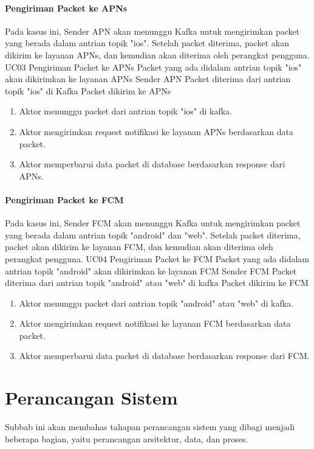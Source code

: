 \paragraph{Pengiriman Packet ke APNs}
\par Pada kasus ini, Sender APN akan menunggu Kafka untuk mengirimkan packet yang berada dalam antrian topik "ios".
Setelah packet diterima, packet akan dikirim ke layanan APNs, dan kemudian akan diterima oleh perangkat pengguna.
\tableUcDesc
{UC03}
{Pengiriman Packet ke APNs}
{Packet yang ada didalam antrian topik "ios" akan dikirimkan ke layanan APNs}
{Sender APN}
{Packet diterima dari antrian topik "ios" di Kafka}
{Packet dikirim ke APNs}
{
\begin{enumerate}
    \item Aktor menunggu packet dari antrian topik "ios" di kafka.
    \item Aktor mengirimkan request notifikasi ke layanan APNs berdasarkan data packet.
    \item Aktor memperbarui data packet di database berdasarkan response dari APNs.
\end{enumerate}
}

\paragraph{Pengiriman Packet ke FCM}
\par Pada kasus ini, Sender FCM akan menunggu Kafka untuk mengirimkan packet yang berada dalam antrian topik "android" dan "web".
Setelah packet diterima, packet akan dikirim ke layanan FCM, dan kemudian akan diterima oleh perangkat pengguna.
\tableUcDesc
{UC04}
{Pengiriman Packet ke FCM}
{Packet yang ada didalam antrian topik "android" akan dikirimkan ke layanan FCM}
{Sender FCM}
{Packet diterima dari antrian topik "android" atau "web" di kafka}
{Packet dikirim ke FCM}
{
\begin{enumerate}
    \item Aktor menunggu packet dari antrian topik "android" atau "web" di kafka.
    \item Aktor mengirimkan request notifikasi ke layanan FCM berdasarkan data packet.
    \item Aktor memperbarui data packet di database berdasarkan response dari FCM.
\end{enumerate}
}

\section{Perancangan Sistem}
\par Subbab ini akan membahas tahapan perancangan sistem yang dibagi menjadi beberapa bagian, yaitu perancangan
arsitektur, data, dan proses.

